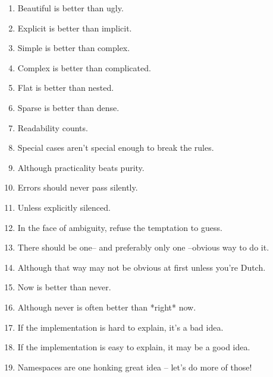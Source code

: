 \documentclass [8pt] {extarticle}
\begin{document}
    \begin {enumerate}
        \item Beautiful is better than ugly.
        \item Explicit is better than implicit.
        \item Simple is better than complex.
        \item Complex is better than complicated.
        \item Flat is better than nested.
        \item Sparse is better than dense.
        \item Readability counts.
        \item Special cases aren't special enough to break the rules.
        \item Although practicality beats purity.
        \item Errors should never pass silently.
        \item Unless explicitly silenced.
        \item In the face of ambiguity, refuse the temptation to guess.
        \item There should be one-- and preferably only one --obvious way to do it.
        \item Although that way may not be obvious at first unless you're Dutch.
        \item Now is better than never.
        \item Although never is often better than *right* now.
        \item If the implementation is hard to explain, it's a bad idea.
        \item If the implementation is easy to explain, it may be a good idea.
        \item Namespaces are one honking great idea -- let's do more of those!
    \end {enumerate}
\end{document}
